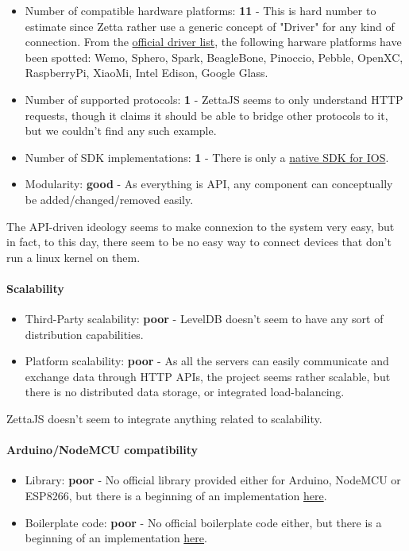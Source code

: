 \documentclass{article}
\begin{document}
\begin{itemize}
\item Number of compatible hardware platforms: \textbf{11} - This is hard number to estimate since Zetta rather use a generic concept of "Driver" for any kind of connection. From the \href{http://www.zettajs.org/modules/}{official driver list}, the following harware platforms have been spotted: Wemo, Sphero, Spark, BeagleBone, Pinoccio, Pebble, OpenXC, RaspberryPi, XiaoMi, Intel Edison, Google Glass.
\item Number of supported protocols: \textbf{1} - ZettaJS seems to only understand HTTP requests, though it claims it should be able to bridge other protocols to it, but we couldn't find any such example.
\item Number of SDK implementations: \textbf{1} - There is only a \href{https://github.com/zettajs/ZettaKit}{native SDK for IOS}.
\item Modularity: \textbf{good} - As everything is API, any component can conceptually be added/changed/removed easily.
\end{itemize}

The API-driven ideology seems to make connexion to the system very easy, but in fact, to this day, there seem to be no easy way to connect devices that don't run a linux kernel on them.

\paragraph{Scalability}

\begin{itemize}
\item Third-Party scalability: \textbf{poor} - LevelDB doesn't seem to have any sort of distribution capabilities.
\item Platform scalability: \textbf{poor} - As all the servers can easily communicate and exchange data through HTTP APIs, the project seems rather scalable, but there is no distributed data storage, or integrated load-balancing.
\end{itemize}

ZettaJS doesn't seem to integrate anything related to scalability.

\paragraph{Arduino/NodeMCU compatibility}

\begin{itemize}
\item Library: \textbf{poor} - No official library provided either for Arduino, NodeMCU or ESP8266, but there is a beginning of an implementation \href{https://github.com/zettajs/zetta-cli/tree/master/sample/basic-arduino}{here}.
\item Boilerplate code: \textbf{poor} - No official boilerplate code either, but there is a beginning of an implementation \href{https://github.com/zettajs/zetta-arduino}{here}.
\end{itemize}
\end{document}
